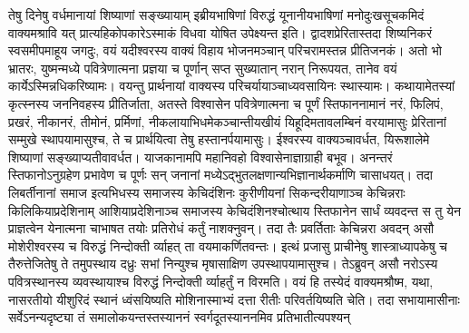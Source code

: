 \adhyAya
{}
\vakya तेषु दिनेषु वर्धमानायां शिष्याणां सङ्ख्यायाम् इब्रीयभाषिणां विरुद्धं यूनानीयभाषिणां मनोदुःखसूचकमिदं वाक्यमश्रावि यत् प्रात्यहिकोपकारेऽस्माकं विधवा योषित उपेक्ष्यन्त इति।
\vakya द्वादशप्रेरितास्तदा शिष्यनिकरं स्वसमीपमाहूय जगदुः, वयं यदीश्वरस्य वाक्यं विहाय भोजनमञ्चान् परिचरामस्तन्न प्रीतिजनकं।
\vakya अतो भो भ्रातरः, युष्मन्मध्ये पवित्रेणात्मना प्रज्ञया च पूर्णान् सप्त सुख्यातान् नरान् निरूपयत, तानेव वयं कार्येऽस्मिन्नधिकरिष्यामः।
\vakya वयन्तु प्रार्थनायां वाक्यस्य परिचर्यायाञ्चाध्यवसायिनः स्थास्यामः।
\vakya कथायामेतस्यां कृत्स्नस्य जननिवहस्य प्रीतिर्जाता, अतस्ते विश्वासेन पवित्रेणात्मना च पूर्णं स्तिफाननामानं नरं, फिलिपं, प्रखरं, नीकानरं, तीमोनं, प्रर्मिणां, नीकलायाभिधमेकञ्चान्तीयखीयं यिहूदिमतावलम्बिनं वरयामासुः
\vakya प्रेरितानां सम्मुखे स्थापयामासुश्च, ते च प्रार्थयित्वा तेषु हस्तानर्पयामासुः।
\vakya ईश्वरस्य वाक्यञ्चावर्धत, यिरूशालेमे शिष्याणां सङ्ख्याप्यतीवावर्धत। याजकानामपि महानिवहो विश्वासेनाज्ञाग्राही बभूव।
\vakya अनन्तरं स्तिफानोऽनुग्रहेण प्रभावेण च पूर्णः सन् जनानां मध्येऽद्भुतलक्षणान्यभिज्ञानार्थकर्माणि चासाधयत्।
\vakya तदा लिबर्तीनानां समाज इत्यभिधस्य समाजस्य केचिदंशिनः कुरीणीयनां सिकन्दरीयाणाञ्च केचिन्नराः किलिकियाप्रदेशिनाम् आशियाप्रदेशिनाञ्च समाजस्य केचिदंशिनश्चोत्थाय स्तिफानेन सार्धं व्यवदन्त
\vakya स तु येन प्राज्ञत्वेन येनात्मना चाभाषत तयोः प्रतिरोधं कर्तुं नाशक्नुवन्।
\vakya तदा तैः प्रवर्तिताः केचिन्नरा अवदन् असौ मोशेरीश्वरस्य च विरुद्धं निन्दोक्ती र्व्याहत् ता वयमाकर्णितवन्तः।
\vakya इत्थं प्रजासु प्राचीनेषु शास्त्राध्यापकेषु च तैरुत्तेजितेषु ते तमुपस्थाय दध्रुः सभां निन्युश्च मृषासाक्षिण उपस्थापयामासुश्च।
\vakya तेऽब्रुवन् असौ नरोऽस्य पवित्रस्थानस्य व्यवस्थायाश्च विरुद्धं निन्दोक्ती र्व्याहर्तुं न विरमति।
\vakya वयं हि तस्येदं वाक्यमश्रौष्म, यथा, नासरतीयो यीशुरिदं स्थानं ध्वंसयिष्यति मोशिनास्माभ्यं दत्ता रीतीः परिवर्तयिष्यति चेति।
\vakya तदा सभायामासीनाः सर्वेऽनन्यदृष्ट्या तं समालोकयन्तस्तस्याननं स्वर्गदूतस्याननमिव प्रतिभातीत्यपश्यन्\eoc